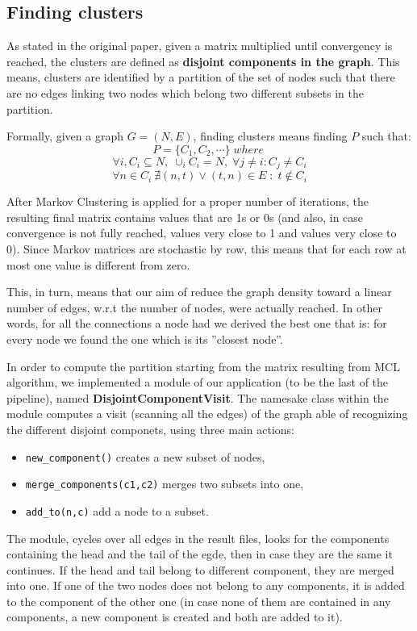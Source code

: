\subsection{Finding clusters}
\label{findingcluster}
As stated in the original paper, given a matrix
multiplied until convergency is reached, the clusters are
defined as \textbf{disjoint components in the graph}. 
This means, clusters are identified by
a partition of the set of nodes such that there are no edges
linking two nodes which belong two different subsets in the partition.

Formally, given a graph $G = (N,E)$, finding clusters means finding $P$ such that:
$$ P = \{ C_1,C_2, \cdots \} \; where \; $$ 
$$\forall i, C_i \subseteq  N, \; \cup_{i} C_i = N, \; \forall j \neq i : C_j \neq C_i$$
$$ \forall n \in C_i \: \nexists (n,t) \lor (t,n) \in E \; : \; t \notin C_i  $$

After Markov Clustering is applied for a proper number of iterations,
the resulting final matrix contains values that are 1s or 0s 
(and also, in case convergence is not fully reached, values very close to 1 and
values very close to 0).
Since Markov matrices are stochastic by row, this means that for each row
at most one value is different from zero.

This, in turn, means that our aim of reduce the graph density toward
a linear number of edges, w.r.t the number of nodes, were  actually reached.
In other words, for all the connections a node had we derived the best one
that is: for every node we found the one which is its ''closest node''.


In order to compute the partition starting from the matrix resulting from MCL algorithm, we implemented a module of our application (to be the last of the pipeline), 
named \textbf{DisjointComponentVisit}.
The namesake class within the module computes a visit (scanning all the edges)
of the graph able of recognizing the different disjoint componets, using three main actions:
\begin{itemize}
    \item \verb!new_component()! creates a new subset of nodes,
    \item \verb!merge_components(c1,c2)! merges two subsets into one,
    \item \verb!add_to(n,c)! add a node to a subset.
\end{itemize}

The module, cycles over all edges in the result files, looks
for the components containing the head and the tail of the egde,
then in case they are the same it continues. If the head and tail
belong to different component, they are merged into one.
If one of the two nodes does not belong to any components, it is
added  to the component of the other one (in case none of them 
are contained in any components, a new component is created and both
are added to it).

